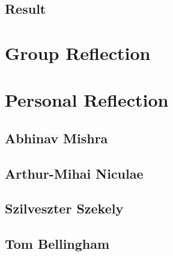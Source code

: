 \documentclass[11pt]{article}
\begin{document}
\subsection{Result}

\section{Group Reflection}

\section{Personal Reflection}
\subsection{Abhinav Mishra}

\subsection{Arthur-Mihai Niculae}

\subsection{Szilveszter Szekely}

\subsection{Tom Bellingham}
\end{document}
